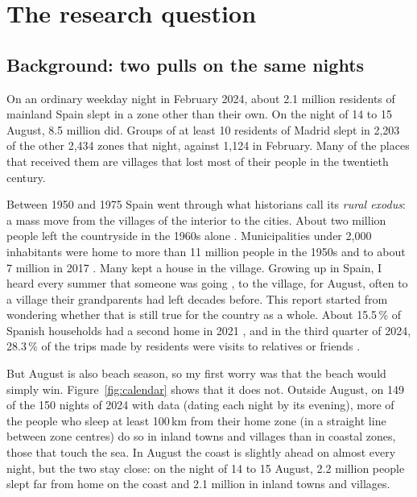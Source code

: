 \section{The research question}\label{sec:question}

\subsection{Background: two pulls on the same nights}

On an ordinary weekday night in February 2024, about 2.1 million residents of mainland Spain slept in a zone other than their own. On the night of 14 to 15 August, 8.5 million did. Groups of at least 10 residents of Madrid slept in 2,203 of the other 2,434 zones that night, against 1,124 in February. Many of the places that received them are villages that lost most of their people in the twentieth century.

Between 1950 and 1975 Spain went through what historians call its \emph{rural exodus}: a mass move from the villages of the interior to the cities. About two million people left the countryside in the 1960s alone \citep[p.~225]{clar2023rural}. Municipalities under 2,000 inhabitants were home to more than 11 million people in the 1950s and to about 7 million in 2017 \citep[p.~5]{pinilla2017rural}. Many kept a house in the village. Growing up in Spain, I heard every summer that someone was going , to the village, for August, often to a village their grandparents had left decades before. This report started from wondering whether that is still true for the country as a whole. About 15.5\,\% of Spanish households had a second home in 2021 \citep{ine2023ecepov}, and in the third quarter of 2024, 28.3\,\% of the trips made by residents were visits to relatives or friends \citep{ine2024etr3t}.

But August is also beach season, so my first worry was that the beach would simply win. Figure~\ref{fig:calendar} shows that it does not. Outside August, on 149 of the 150 nights of 2024 with data (dating each night by its evening), more of the people who sleep at least 100\,km from their home zone (in a straight line between zone centres) do so in inland towns and villages than in coastal zones, those that touch the sea. In August the coast is slightly ahead on almost every night, but the two stay close: on the night of 14 to 15 August, 2.2 million people slept far from home on the coast and 2.1 million in inland towns and villages.

